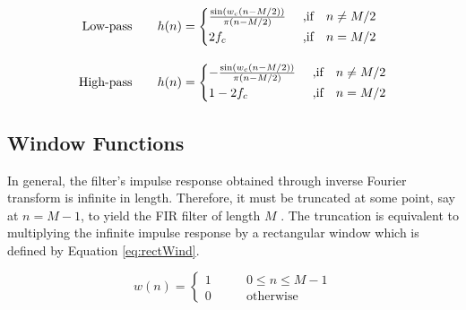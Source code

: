 \begin{align}
\text{Low-pass\qquad} & h(n) = \begin{cases}
\frac{\sin \left( w_c \left( n - M / 2 \right) \right)}{\pi \left( n - M / 2 \right)} & \  \text{,if} \quad n \neq M / 2 \\[0.2em]
2 f_c & \  \text{,if} \quad n = M / 2
\end{cases} \label{eq:lowPass}\\[1em]
\text{High-pass\qquad} & h(n) = \begin{cases}
-\frac{\sin \left( w_c \left( n - M / 2 \right) \right)}{\pi \left( n - M / 2 \right)} & \  \text{,if} \quad n \neq M / 2 \\[0.2em]
1 - 2 f_c & \  \text{,if} \quad n = M / 2
\end{cases}\label{eq:highPass}
\end{align}

\subsection{Window Functions}
In general, the filter's impulse response obtained through inverse Fourier transform is infinite in length. Therefore, it must be truncated at some point, say at $n = M-1$, to yield the FIR filter of length $M$ \cite[p. 624]{DSP3}. The truncation is equivalent to multiplying the infinite impulse response by a rectangular window  which is defined by Equation \ref{eq:rectWind}.

\begin{equation}
\label{eq:rectWind}
w(n) = \begin{cases}
1 &\qquad 0 \leq n \leq M-1\\
0 &\qquad \text{otherwise}
\end{cases}
\end{equation}

